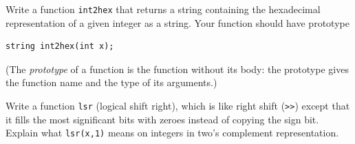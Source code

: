 \begin{exercise}
  Write a function \lstinline'int2hex' that returns a string containing the
  hexadecimal representation of a given integer as a string.  Your
  function should have prototype
\begin{lstlisting}[language={[C0]C}]
string int2hex(int x);
\end{lstlisting}
(The \emph{prototype} of a function is the function without its body:
the prototype gives the function name and the type of its arguments.)
\end{exercise}


\begin{exercise}
  Write a function \lstinline'lsr' (logical shift right), which is like
  right shift (\lstinline'>>') except that it fills the most significant
  bits with zeroes instead of copying the sign bit.  Explain what
  \lstinline'lsr(x,1)' means on integers in two's complement
  representation.
\end{exercise}



